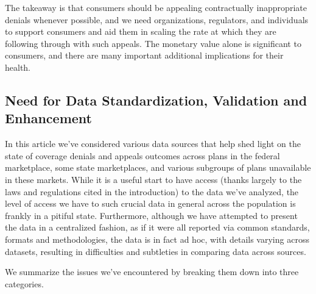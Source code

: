 \documentclass[12pt, a4paper,twoside,parskip=full]{report}
\theoremstyle{plain} %
\theoremstyle{definition} %
\theoremstyle{remark} %
\numberwithin{equation}{chapter}
\begin{document}
		The takeaway is that consumers should be appealing contractually inappropriate denials whenever possible, and we need organizations, regulators, and individuals to support consumers and aid them in scaling the rate at which they are following through with such appeals. The monetary value alone is significant to consumers, and there are many important additional implications for their health.
		
		\subsection{Need for Data Standardization, Validation and Enhancement}
		
		In this article we've considered various data sources that help shed light on the state of coverage denials and appeals outcomes across plans in the federal marketplace, some state marketplaces, and various subgroups of plans unavailable in these markets. While it is a useful start to have access (thanks largely to the laws and regulations cited in the introduction) to the data we've analyzed, the level of access we have to such crucial data in general across the population is frankly in a pitiful state. Furthermore, although we have attempted to present the data in a centralized fashion, as if it were all reported via common standards, formats and methodologies, the data is in fact ad hoc, with details varying across datasets, resulting in difficulties and subtleties in comparing data across sources.
		
		We summarize the issues we've encountered by breaking them down into three categories.
		
\end{document}
